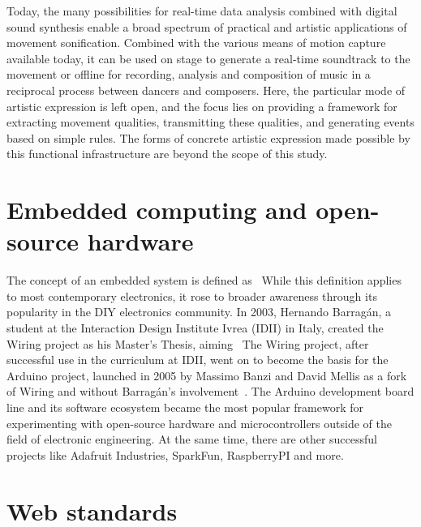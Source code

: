 Today, the many possibilities for real-time data analysis combined with digital sound synthesis enable a broad spectrum of practical and artistic applications of movement sonification.
Combined with the various means of motion capture available today, it can be used on stage to generate a real-time soundtrack to the movement or offline for recording, analysis and composition of music in a reciprocal process between dancers and composers.
Here, the particular mode of artistic expression is left open, and the focus lies on providing a framework for extracting movement qualities, transmitting these qualities, and generating events based on simple rules.
The forms of concrete artistic expression made possible by this functional infrastructure are beyond the scope of this study.

\section{Embedded computing and open-source hardware}
\label{sec:embeddedcomputing}

The concept of an embedded system is defined as~
While this definition applies to most contemporary electronics, it rose to broader awareness through its popularity in the \ac{DIY} electronics community.
In 2003, Hernando Barragán, a student at the Interaction Design Institute Ivrea (IDII) in Italy, created the Wiring project as his Master's Thesis, aiming~
The Wiring project, after successful use in the curriculum at IDII, went on to become the basis for the Arduino project, launched in 2005 by Massimo Banzi and David Mellis as a fork of Wiring and without Barragán's involvement~\parencite{arduinoHistory}.
The Arduino development board line and its software ecosystem became the most popular framework for experimenting with open-source hardware and microcontrollers outside of the field of electronic engineering.
At the same time, there are other successful projects like Adafruit Industries, SparkFun, RaspberryPI and more.


\section{Web standards}
\label{sec:webstandards}

